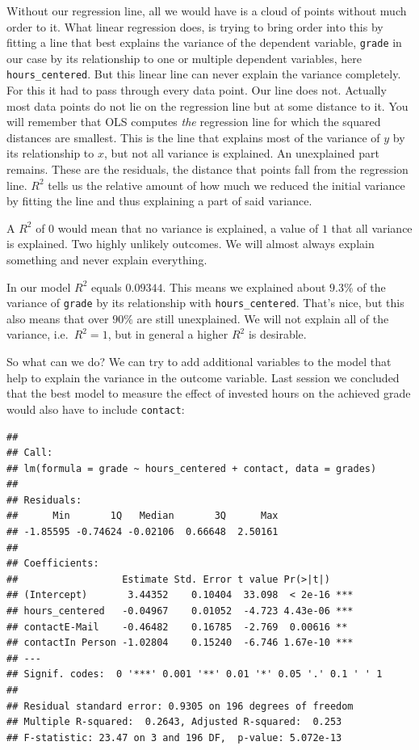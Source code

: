 \documentclass[
]{book}
\begin{document}
Without our regression line, all we would have is a cloud of points without much
order to it. What linear regression does, is trying to bring order into this by
fitting a line that best explains the variance of the dependent variable, \texttt{grade}
in our case by its relationship to one or multiple dependent variables, here
\texttt{hours\_centered}.
But this linear line can never explain the variance completely.
For this it had to pass through every data point. Our line does not. Actually
most data points do not lie on the regression line but at some distance to it.
You will remember that OLS computes \emph{the} regression line for which the squared
distances are smallest. This is the line that explains most of the variance of \(y\)
by its relationship to \(x\), but not all variance is explained. An unexplained part
remains. These are the residuals, the distance that points fall from the
regression line. \(R^2\) tells us the relative amount of how much we reduced the
initial variance by fitting the line and thus explaining a part of said
variance.

A \(R^2\) of \(0\) would mean that no variance is explained, a value of \(1\) that all
variance is explained. Two highly unlikely outcomes. We will almost always
explain something and never explain everything.

In our model \(R^2\) equals \(0.09344\). This means we explained about \(9.3\%\) of the
variance of \texttt{grade} by its relationship with \texttt{hours\_centered}. That's nice,
but this also means that over \(90\%\) are still unexplained. We will not explain
all of the variance, i.e.~\(R^2 = 1\), but in general a higher \(R^2\) is desirable.

So what can we do? We can try to add additional variables to the model that help
to explain the variance in the outcome variable. Last session we concluded
that the best model to measure the effect of invested hours on the achieved
grade would also have to include \texttt{contact}:

\begin{verbatim}
## 
## Call:
## lm(formula = grade ~ hours_centered + contact, data = grades)
## 
## Residuals:
##      Min       1Q   Median       3Q      Max 
## -1.85595 -0.74624 -0.02106  0.66648  2.50161 
## 
## Coefficients:
##                  Estimate Std. Error t value Pr(>|t|)    
## (Intercept)       3.44352    0.10404  33.098  < 2e-16 ***
## hours_centered   -0.04967    0.01052  -4.723 4.43e-06 ***
## contactE-Mail    -0.46482    0.16785  -2.769  0.00616 ** 
## contactIn Person -1.02804    0.15240  -6.746 1.67e-10 ***
## ---
## Signif. codes:  0 '***' 0.001 '**' 0.01 '*' 0.05 '.' 0.1 ' ' 1
## 
## Residual standard error: 0.9305 on 196 degrees of freedom
## Multiple R-squared:  0.2643, Adjusted R-squared:  0.253 
## F-statistic: 23.47 on 3 and 196 DF,  p-value: 5.072e-13
\end{verbatim}
\end{document}
